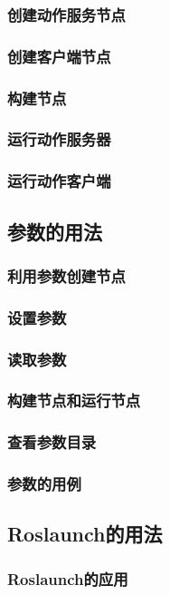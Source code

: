 \documentclass[geye,green,kindle,cn]{elegantnote}
\begin{document}
\subsubsection{创建动作服务节点}
\subsubsection{创建客户端节点}
\subsubsection{构建节点}
\subsubsection{运行动作服务器}
\subsubsection{运行动作客户端}
\subsection{参数的用法}
\subsubsection{利用参数创建节点}
\subsubsection{设置参数}
\subsubsection{读取参数}
\subsubsection{构建节点和运行节点}
\subsubsection{查看参数目录}
\subsubsection{参数的用例}
\subsection{Roslaunch的用法}
\subsubsection{Roslaunch的应用}
\end{document}
